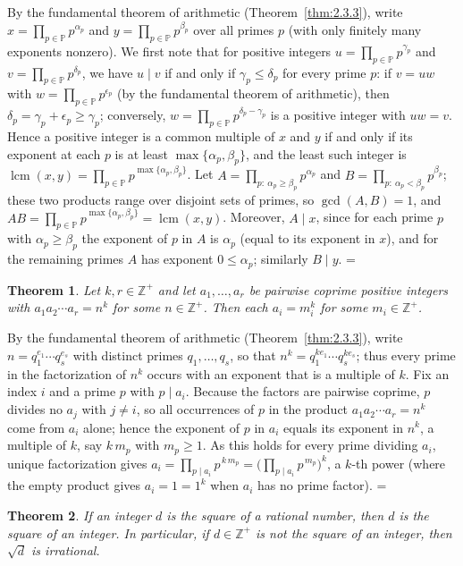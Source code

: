 \documentclass[11pt]{article}
\makeatletter
\theoremstyle{ntstyle}
\newtheorem{theorem}{Theorem}[subsection]
\let\nt@closedisplay\]
\def\nt@guardedclose{\@ifnextchar\par{\nt@closeafterpar}{\@ifnextchar\end{\postdisplaypenalty\@M\nt@closedisplay}{\nt@closedisplay}}}
\def\nt@closeafterpar\par{\@ifnextchar\par{\nt@closeafterpar}{\@ifnextchar\end{\postdisplaypenalty\@M\nt@closedisplay\par}{\nt@closedisplay\par}}}
\renewenvironment{proof}[1][\proofname]{\par
  \pushQED{\qed}\normalfont\topsep\medskipamount\edef\nt@afterproof{\@endparpenalty=\the\@endparpenalty\relax}\@beginparpenalty\@M\@endparpenalty\@M\let\]\nt@guardedclose\trivlist\item[]\textit{#1\@addpunct{.}} \ignorespaces}{\ifvmode\addpenalty\@M\fi\popQED\nt@afterproof\endtrivlist\@endpefalse}
\newcommand{\Primes}{\mathbb{P}}
\DeclareMathOperator{\lcm}{lcm}
\makeatother
\begin{document}
\begin{proof} By the fundamental theorem of arithmetic (Theorem~\ref{thm:2.3.3}),
	write $x = \prod_{p\in\Primes} p^{\alpha_p}$ and $y = \prod_{p\in\Primes}
		p^{\beta_p}$ over all primes $p$ (with only finitely many exponents
	nonzero). We first note that for positive integers $u = \prod_{p\in\Primes}
		p^{\gamma_p}$ and $v = \prod_{p\in\Primes} p^{\delta_p}$, we have $u \mid v$ if and only if
	$\gamma_p \le \delta_p$ for every prime $p$: if $v = uw$ with $w =
		\prod_{p\in\Primes} p^{\epsilon_p}$ (by the fundamental theorem of arithmetic), then $\delta_p = \gamma_p + \epsilon_p
		\ge \gamma_p$; conversely, $w = \prod_{p\in\Primes} p^{\delta_p - \gamma_p}$ is a
	positive integer with $uw = v$. Hence a positive integer is a common
	multiple of $x$ and $y$ if and only if its exponent at each $p$ is at least
		$\max\{\alpha_p, \beta_p\}$, and the least such integer is
	$\lcm(x, y) = \prod_{p\in\Primes} p^{\max\{\alpha_p, \beta_p\}}$. Let
	$A = \prod_{p:\ \alpha_p \ge \beta_p} p^{\alpha_p}$ and $B =
		\prod_{p:\ \alpha_p < \beta_p} p^{\beta_p}$; these two products range
	over disjoint sets of primes, so $\gcd(A, B) = 1$, and $AB = \prod_{p\in\Primes}
		p^{\max\{\alpha_p, \beta_p\}} = \lcm(x, y)$. Moreover, $A
		\mid x$, since for each prime $p$ with $\alpha_p \ge \beta_p$ the
	exponent of $p$ in $A$ is $\alpha_p$ (equal to its exponent in $x$),
	and for the remaining primes $A$ has exponent $0 \le \alpha_p$;
	similarly $B \mid y$.
\end{proof}
\begin{theorem}\label{thm:2.3.6} Let $k,r\in\mathbb{Z}^+$ and let
	$a_1,\ldots,a_r$ be pairwise coprime
	positive integers with $a_1a_2\cdots a_r=n^{k}$ for some
	$n\in\mathbb{Z}^+$. Then each $a_i=m_i^k$ for some $m_i\in\mathbb{Z}^+$.
\end{theorem}

\begin{proof} By the fundamental theorem of arithmetic
	(Theorem~\ref{thm:2.3.3}), write $n=q_1^{e_1}\cdots q_s^{e_s}$ with distinct
	primes $q_1,\ldots,q_s$, so that $n^{k}=q_1^{ke_1}\cdots q_s^{ke_s}$;
	thus every prime in the factorization of $n^{k}$ occurs with an
	exponent that is a multiple of $k$. Fix an index $i$ and a prime $p$
	with $p\mid a_i$. Because the factors are pairwise coprime, $p$
	divides no $a_j$ with $j\neq i$, so all occurrences of $p$ in the
	product $a_1a_2\cdots a_r=n^{k}$ come from $a_i$ alone; hence the
	exponent of $p$ in $a_i$ equals its exponent in $n^{k}$, a multiple
	of $k$, say $k\,m_p$ with $m_p\ge1$. As this holds for every prime
	dividing $a_i$, unique factorization gives $a_i=\prod_{p\mid
			a_i}p^{\,k\,m_p}=\Big(\prod_{p\mid a_i}p^{\,m_p}\Big)^{k}$, a $k$-th
	power (where the empty product gives $a_i=1=1^{k}$ when $a_i$ has no prime
	factor).
\end{proof}
\begin{theorem}\label{thm:2.3.7} If an integer $d$ is the square of a rational
	number, then $d$ is the square of an integer. In particular, if
	$d\in\mathbb{Z}^+$ is not the square of an integer, then $\sqrt{d}$ is
	irrational.
\end{theorem}
\end{document}
